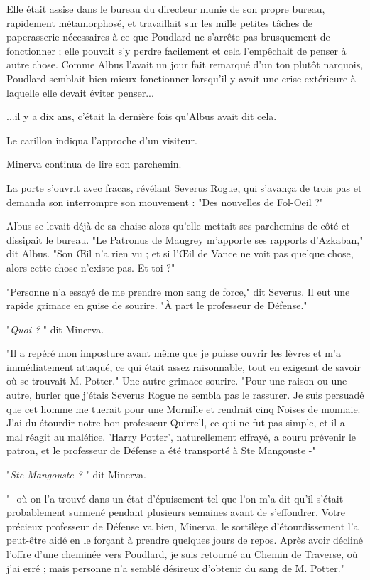 Elle était assise dans le bureau du directeur munie de son propre bureau, rapidement métamorphosé, et travaillait sur les mille petites tâches de paperasserie nécessaires à ce que Poudlard ne s'arrête pas brusquement de fonctionner ; elle pouvait s'y perdre facilement et cela l'empêchait de penser à autre chose. Comme Albus l'avait un jour fait remarqué d'un ton plutôt narquois, Poudlard semblait bien mieux fonctionner lorsqu'il y avait une crise extérieure à laquelle elle devait éviter penser...

...il y a dix ans, c'était la dernière fois qu'Albus avait dit cela.

Le carillon indiqua l'approche d'un visiteur.

Minerva continua de lire son parchemin.

La porte s'ouvrit avec fracas, révélant Severus Rogue, qui s'avança de trois pas et demanda son interrompre son mouvement : "Des nouvelles de Fol-Oeil ?"

Albus se levait déjà de sa chaise alors qu'elle mettait ses parchemins de côté et dissipait le bureau. "Le Patronus de Maugrey m'apporte ses rapports d'Azkaban," dit Albus. "Son Œil n'a rien vu ; et si l'Œil de Vance ne voit pas quelque chose, alors cette chose n'existe pas. Et toi ?"

"Personne n'a essayé de me prendre mon sang de force," dit Severus. Il eut une rapide grimace en guise de sourire. "À part le professeur de Défense."

"\emph{Quoi ?} " dit Minerva.

"Il a repéré mon imposture avant même que je puisse ouvrir les lèvres et m'a immédiatement attaqué, ce qui était assez raisonnable, tout en exigeant de savoir où se trouvait M. Potter." Une autre grimace-sourire. "Pour une raison ou une autre, hurler que j'étais Severus Rogue ne sembla pas le rassurer. Je suis persuadé que cet homme me tuerait pour une Mornille et rendrait cinq Noises de monnaie. J'ai du étourdir notre bon professeur Quirrell, ce qui ne fut pas simple, et il a mal réagit au maléfice. 'Harry Potter', naturellement effrayé, a couru prévenir le patron, et le professeur de Défense a été transporté à Ste Mangouste -"

"\emph{Ste Mangouste ?} " dit Minerva.

"- où on l'a trouvé dans un état d'épuisement tel que l'on m'a dit qu'il s'était probablement surmené pendant plusieurs semaines avant de s'effondrer. Votre précieux professeur de Défense va bien, Minerva, le sortilège d'étourdissement l'a peut-être aidé en le forçant à prendre quelques jours de repos. Après avoir décliné l'offre d'une cheminée vers Poudlard, je suis retourné au Chemin de Traverse, où j'ai erré ; mais personne n'a semblé désireux d'obtenir du sang de M. Potter."

